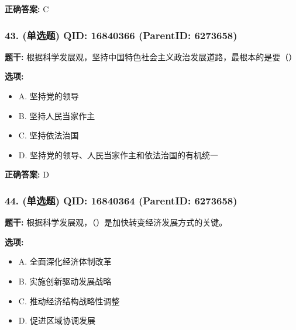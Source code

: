 \documentclass[12pt,UTF8]{ctexart}
\begin{document}
\textbf{正确答案:}
C

\vspace{0.3em}\hrulefill\vspace{0.7em}

\subsubsection*{43. (单选题) \small QID: 16840366 (ParentID: 6273658)}

\textbf{题干:}
根据科学发展观，坚持中国特色社会主义政治发展道路，最根本的是要（）



\textbf{选项:}
\begin{itemize}[leftmargin=*]

  \item A. 坚持党的领导

  \item B. 坚持人民当家作主

  \item C. 坚持依法治国

  \item D. 坚持党的领导、人民当家作主和依法治国的有机统一

\end{itemize}

\textbf{正确答案:}
D

\vspace{0.3em}\hrulefill\vspace{0.7em}

\subsubsection*{44. (单选题) \small QID: 16840364 (ParentID: 6273658)}

\textbf{题干:}
根据科学发展观，（）是加快转变经济发展方式的关键。



\textbf{选项:}
\begin{itemize}[leftmargin=*]

  \item A. 全面深化经济体制改革

  \item B. 实施创新驱动发展战略

  \item C. 推动经济结构战略性调整

  \item D. 促进区域协调发展

\end{itemize}
\end{document}

